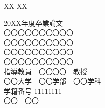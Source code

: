 \begin{titlepage}
    \begin{flushright}
        \Large XX-XX  %
    \end{flushright}
    \vspace{2cm}
    \begin{center}
        {\LARGE 20XX年度卒業論文} \\
        \vspace{2cm}
        {\LARGE 〇〇〇〇〇〇〇〇〇〇\\[2truemm]
        〇〇〇〇〇〇〇〇〇〇\\[2truemm]
        〇〇〇〇〇〇〇〇〇〇\\[4truemm]
        〇〇〇〇〇〇〇〇〇〇} \\

        \vspace{4.5cm}
        {\LARGE 指導教員　〇〇〇〇　教授} \\
        \vspace{1cm}
        {\LARGE 〇〇大学　〇〇学部　〇〇学科} \\
        \vspace{2cm}
        {\LARGE 学籍番号 11111111} \\
        \vspace{1cm}
        {\LARGE 〇〇　〇〇} \\
    \end{center}
\end{titlepage}
